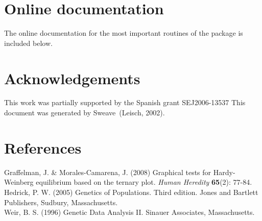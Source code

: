 \documentclass[a4paper]{article}
\begin{document}
\clearpage

\section{Online documentation}
\label{sec:online}

The online documentation for the most important routines of the package is
included below.








\section*{Acknowledgements}

This work was partially supported by the Spanish grant SEJ2006-13537 This document was generated by 
Sweave~(Leisch, 2002).

\section{References}

Graffelman, J. \& Morales-Camarena, J. (2008) Graphical tests for Hardy-Weinberg equilibrium
based on the ternary plot. {\it Human Heredity} {\bf 65}(2): 77-84.\\

Hedrick, P. W. (2005) Genetics of Populations. Third edition. Jones and Bartlett Publishers,
Sudbury, Massachusetts.\\

Weir, B. S. (1996) Genetic Data Analysis II. Sinauer Associates, Massachusetts.
\end{document}
